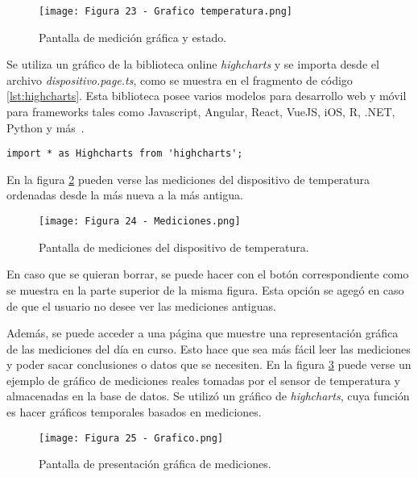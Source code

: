 \begin{figure}[h]
\centering
\texttt{[image: Figura 23 - Grafico temperatura.png]}
\caption[Pantalla de medición gráfica y estado]{Pantalla de medición gráfica y estado.}
\label{fig:23}
\end{figure}

Se utiliza un gráfico de la biblioteca online \textit{highcharts} y se importa desde el archivo \textit{dispositivo.page.ts}, como se muestra en el fragmento de código \ref{lst:highcharts}. Esta biblioteca posee varios modelos para desarrollo web y móvil para frameworks tales como Javascript, Angular, React, VueJS, iOS, R, .NET, Python y más\ \citep{33}.

\begin{lstlisting}[caption={Importación de gráfico de \textit{highcharts}.}, label={lst:highcharts}]
import * as Highcharts from 'highcharts';
\end{lstlisting}

En la figura \ref{fig:24} pueden verse las mediciones del dispositivo de temperatura ordenadas desde la más nueva a la más antigua.

\begin{figure}[h]
\centering
\texttt{[image: Figura 24 - Mediciones.png]}
\caption[Pantalla de mediciones del dispositivo de temperatura]{Pantalla de mediciones del dispositivo de temperatura.}
\label{fig:24}
\end{figure}

En caso que se quieran borrar, se puede hacer con el botón correspondiente como se muestra en la parte superior de la misma figura. Esta opción se agegó en caso de que el usuario no desee ver las mediciones antiguas.

Además, se puede acceder a una página que muestre una representación gráfica de las mediciones del día en curso. Esto hace que sea más fácil leer las mediciones y poder sacar conclusiones o datos que se necesiten. En la figura \ref{fig:25} puede verse un ejemplo de gráfico de mediciones reales tomadas por el sensor de temperatura y almacenadas en la base de datos. Se utilizó un gráfico de \textit{highcharts}, cuya función es hacer gráficos temporales basados en mediciones.

\begin{figure}[h]
\centering
\texttt{[image: Figura 25 - Grafico.png]}
\caption[Pantalla de presentación gráfica de mediciones]{Pantalla de presentación gráfica de mediciones.}
\label{fig:25}
\end{figure}

